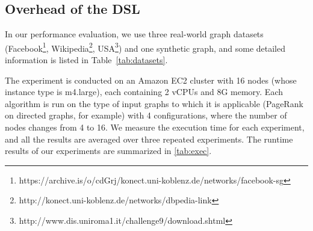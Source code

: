 \documentclass{sokendai_thesis} %
\begin{document}
\subsection{Overhead of the DSL}

\begin{table}[t]
 \centering
 \caption{Datasets for performance evaluation}
 \label{tab:datasets}
\end{table}

In our performance evaluation, we use three real-world graph datasets (Facebook\footnote{https://archive.is/o/cdGrj/konect.uni-koblenz.de/networks/facebook-sg}, Wikipedia\footnote{http://konect.uni-koblenz.de/networks/dbpedia-link}, USA\footnote{http://www.dis.uniroma1.it/challenge9/download.shtml}) and one synthetic graph, and some detailed information is listed in Table~\ref{tab:datasets}.

The experiment is conducted on an Amazon EC2 cluster with 16 nodes (whose instance type is m4.large), each containing 2 vCPUs and 8G memory.
Each algorithm is run on the type of input graphs to which it is applicable (PageRank on directed graphs, for example) with 4 configurations, where the number of nodes changes from 4 to 16.
We measure the execution time for each experiment, and all the results are averaged over three repeated experiments.
The runtime results of our experiments are summarized in \autoref{tab:exec}.
\end{document}
